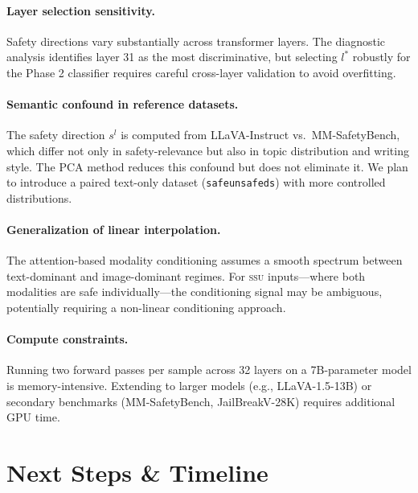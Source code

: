 \documentclass{article}
\newcommand{\safel}{s^l}
\begin{document}
\paragraph{Layer selection sensitivity.}
Safety directions vary substantially across transformer layers.
The diagnostic analysis identifies layer 31 as the most discriminative, but selecting
$l^*$ robustly for the Phase 2 classifier requires careful cross-layer validation to
avoid overfitting.

\paragraph{Semantic confound in reference datasets.}
The safety direction $\safel$ is computed from LLaVA-Instruct vs.\ MM-SafetyBench, which differ
not only in safety-relevance but also in topic distribution and writing style.
The PCA method reduces this confound but does not eliminate it.
We plan to introduce a paired text-only dataset (\texttt{safeunsafeds}) with more controlled
distributions.

\paragraph{Generalization of linear interpolation.}
The attention-based modality conditioning assumes a smooth spectrum between text-dominant
and image-dominant regimes.
For \textsc{ssu} inputs---where both modalities are safe individually---the conditioning
signal may be ambiguous, potentially requiring a non-linear conditioning approach.

\paragraph{Compute constraints.}
Running two forward passes per sample across 32 layers on a 7B-parameter model is
memory-intensive.
Extending to larger models (e.g., LLaVA-1.5-13B) or secondary benchmarks
(MM-SafetyBench, JailBreakV-28K) requires additional GPU time.

\section{Next Steps \& Timeline}
\end{document}
